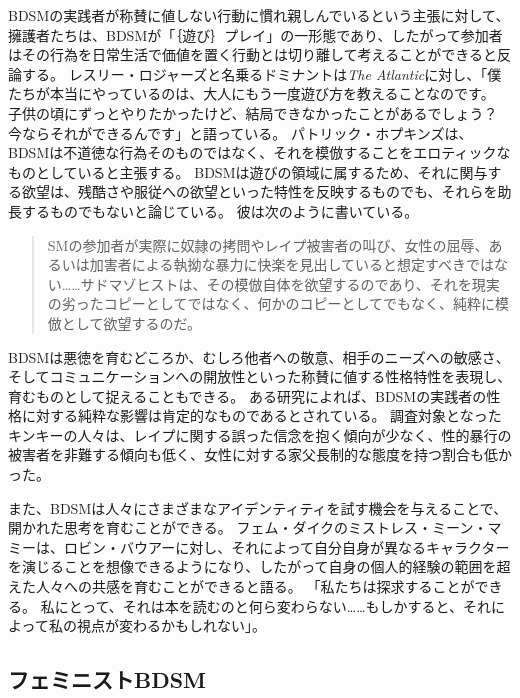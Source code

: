 \documentclass[paper=a4,book,openany]{jlreq}
\begin{document}
BDSMの実践者が称賛に値しない行動に慣れ親しんでいるという主張に対して、擁護者たちは、BDSMが「｛遊び｝{プレイ}」の一形態であり、したがって参加者はその行為を日常生活で価値を置く行動とは切り離して考えることができると反論する。
レスリー・ロジャーズと名乗るドミナントは\emph{The Atlantic}に対し、「僕たちが本当にやっているのは、大人にもう一度遊び方を教えることなのです。
子供の頃にずっとやりたかったけど、結局できなかったことがあるでしょう？ 今ならそれができるんです」と語っている\citep{morin15:_that_time_i_tried_bdsm_therap}。
パトリック・ホプキンズは、BDSMは不道徳な行為そのものではなく、それを模倣することをエロティックなものとしていると主張する。
BDSMは遊びの領域に属するため、それに関与する欲望は、残酷さや服従への欲望といった特性を反映するものでも、それらを助長するものでもないと論じている。
彼は次のように書いている。

\begin{quote}
  SMの参加者が実際に奴隷の拷問やレイプ被害者の叫び、女性の屈辱、あるいは加害者による執拗な暴力に快楽を見出していると想定すべきではない……サドマゾヒストは、その模倣自体を欲望するのであり、それを現実の劣ったコピーとしてではなく、何かのコピーとしてでもなく、純粋に模倣として欲望するのだ。
\citep[p.125]{hopkins94:_rethin_sadom}

\end{quote}

BDSMは悪徳を育むどころか、むしろ他者への敬意、相手のニーズへの敏感さ、そしてコミュニケーションへの開放性といった称賛に値する性格特性を表現し、育むものとして捉えることもできる。
ある研究によれば、BDSMの実践者の性格に対する純粋な影響は肯定的なものであるとされている。
調査対象となったキンキーの人々は、レイプに関する誤った信念を抱く傾向が少なく、性的暴行の被害者を非難する傾向も低く、女性に対する家父長制的な態度を持つ割合も低かった\citep[p.1]{klement16:_partic_cultur_consen_may_be}。

また、BDSMは人々にさまざまなアイデンティティを試す機会を与えることで、開かれた思考を育むことができる。
フェム・ダイクのミストレス・ミーン・マミーは、ロビン・バウアーに対し、それによって自分自身が異なるキャラクターを演じることを想像できるようになり、したがって自身の個人的経験の範囲を超えた人々への共感を育むことができると語る。
「私たちは探求することができる。
私にとって、それは本を読むのと何ら変わらない……もしかすると、それによって私の視点が変わるかもしれない」\citep[p.141]{bauer18:_bois_grrrl_meet_their_daddies}。

\subsection{フェミニストBDSM}
\end{document}
